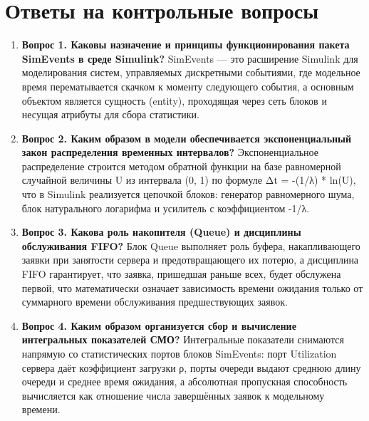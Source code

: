 \documentclass[a4paper,14pt,oneside,openany]{memoir}
\begin{document}
\section*{Ответы на контрольные вопросы}
\begin{enumerate}
    \item \textbf{Вопрос 1. Каковы назначение и принципы функционирования пакета SimEvents в среде Simulink? } SimEvents — это расширение Simulink для моделирования систем, управляемых дискретными событиями, где модельное время перематывается скачком к моменту следующего события, а основным объектом является сущность (entity), проходящая через сеть блоков и несущая атрибуты для сбора статистики.
    \item \textbf{Вопрос 2. Каким образом в модели обеспечивается экспоненциальный закон распределения временных интервалов?} Экспоненциальное распределение строится методом обратной функции на базе равномерной случайной величины U из интервала (0, 1) по формуле Δt = -(1/λ) * ln(U), что в Simulink реализуется цепочкой блоков: генератор равномерного шума, блок натурального логарифма и усилитель с коэффициентом -1/λ.
    \item \textbf{Вопрос 3. Какова роль накопителя (Queue) и дисциплины обслуживания FIFO?} Блок Queue выполняет роль буфера, накапливающего заявки при занятости сервера и предотвращающего их потерю, а дисциплина FIFO гарантирует, что заявка, пришедшая раньше всех, будет обслужена первой, что математически означает зависимость времени ожидания только от суммарного времени обслуживания предшествующих заявок.
    \item \textbf{Вопрос 4. Каким образом организуется сбор и вычисление интегральных показателей СМО?} Интегральные показатели снимаются напрямую со статистических портов блоков SimEvents: порт Utilization сервера даёт коэффициент загрузки ρ, порты очереди выдают среднюю длину очереди и среднее время ожидания, а абсолютная пропускная способность вычисляется как отношение числа завершённых заявок к модельному времени.
\end{enumerate}
\end{document}
